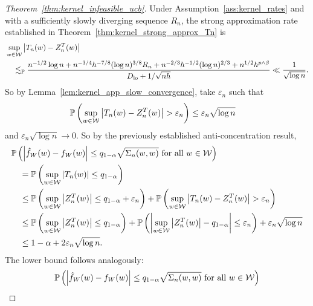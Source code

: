 \begin{proof}[Theorem~\ref{thm:kernel_infeasible_ucb}]
  Under Assumption~\ref{ass:kernel_rates} and with a
  sufficiently slowly diverging sequence $R_n$,
  the strong approximation rate established in
  Theorem~\ref{thm:kernel_strong_approx_Tn} is
  \begin{align*}
    &\sup_{w \in \mathcal{W}} \left| T_n(w) - Z_n^T(w) \right| \\
    &\quad\lesssim_{\mathbb{P}}
    \frac{
      n^{-1/2} \log n
      + n^{-3/4} h^{-7/8} (\log n)^{3/8} R_n
      + n^{-2/3} h^{-1/2} (\log n)^{2/3}
    + n^{1/2} h^{p \wedge \beta}}
    {D_{\textup{lo}} + 1/\sqrt{n h}}
    \ll \frac{1}{\sqrt{\log n}}.
  \end{align*}
  So by Lemma~\ref{lem:kernel_app_slow_convergence}, take $\varepsilon_n$ such
  that
  \begin{align*}
    \mathbb{P} \left(
      \sup_{w \in \mathcal{W}} \left| T_n(w) - Z_n^T(w) \right|
      > \varepsilon_n
    \right)
    &\leq
    \varepsilon_n \sqrt{\log n}
  \end{align*}
  and $\varepsilon_n \sqrt{\log n} \to 0$.
  So by the previously established anti-concentration result,
  \begin{align*}
    &\mathbb{P}\left(
      \left|
      \hat f_W(w) - f_W(w)
      \right|
      \leq
      q_{1-\alpha}
      \sqrt{\Sigma_n(w,w)}
      \textup{ for all }
      w \in \mathcal{W}
    \right) \\
    &\quad=
    \mathbb{P}\left(
      \sup_{w \in \mathcal{W}}
      \left| T_n(w) \right|
      \leq
      q_{1-\alpha}
    \right) \\
    &\quad\leq
    \mathbb{P}\left(
      \sup_{w \in \mathcal{W}}
      \left| Z_n^T(w) \right|
      \leq
      q_{1-\alpha}
      + \varepsilon_n
    \right)
    + \mathbb{P} \left(
      \sup_{w \in \mathcal{W}} \left| T_n(w) - Z_n^T(w) \right|
      > \varepsilon_n
    \right) \\
    &\quad\leq
    \mathbb{P}\left(
      \sup_{w \in \mathcal{W}}
      \left|
      Z_n^T(w)
      \right|
      \leq
      q_{1-\alpha}
    \right)
    + \mathbb{P}\left(
      \left|
      \sup_{w \in \mathcal{W}}
      \big| Z_n^T(w) \big|
      - q_{1-\alpha}
      \right|
      \leq \varepsilon_n
    \right)
    + \varepsilon_n \sqrt{\log n} \\
    &\quad\leq
    1 - \alpha
    + 2 \varepsilon_n \sqrt{\log n}.
  \end{align*}
  The lower bound follows analogously:
  \begin{align*}
    &\P\left(
      \left|
      \hat f_W(w) - f_W(w)
      \right|
      \leq
      q_{1-\alpha}
      \sqrt{\Sigma_n(w,w)}
      \textup{ for all }
      w \in \cW
    \right) \\

\end{align*}
\end{proof}
